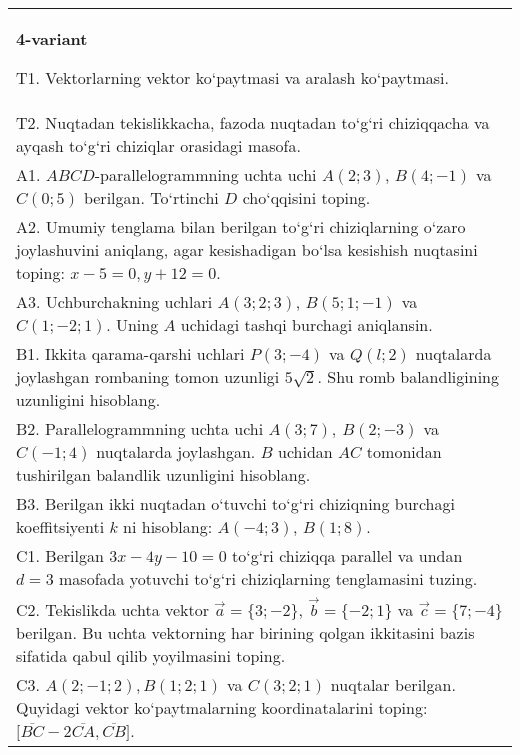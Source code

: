 \documentclass{article}
\begin{document}
\begin{tabular}{m{17cm}}
\textbf{4-variant}

T1. 
Vektorlarning vektor ko‘paytmasi va aralash ko‘paytmasi.
 \\
T2. 
Nuqtadan tekislikkacha, fazoda nuqtadan to‘g‘ri chiziqqacha va ayqash to‘g‘ri chiziqlar orasidagi masofa.
 \\
A1. 
$ABCD$-parallelogrammning uchta uchi
$A (2;3) $, $B (4;-1) $ va $C (0;5) $ berilgan. To‘rtinchi $D$
cho‘qqisini toping.
 \\
A2. 
Umumiy tenglama bilan berilgan to‘g‘ri chiziqlarning
o‘zaro joylashuvini aniqlang, agar kesishadigan bo‘lsa kesishish nuqtasini
toping: $x-5=0, y+12=0$.
 \\
A3. 
Uchburchakning uchlari
$A (3;2; 3) $, $B (5;1; - 1) $ va $C (1; -2;1) $. Uning $A$ uchidagi tashqi burchagi aniqlansin.
 \\
B1. 
Ikkita qarama-qarshi uchlari $P (3; -4) $ va $Q (l;2) $ nuqtalarda joylashgan rombaning tomon uzunligi \(5\sqrt{2}\). Shu romb balandligining uzunligini hisoblang.
 \\
B2. 
Parallelogrammning uchta uchi \(A (3;7),\ B (2;-3) \) va
\(C (-1;4) \) nuqtalarda joylashgan. $B$ uchidan $AC$
tomonidan tushirilgan balandlik uzunligini hisoblang.
 \\
B3. 
Berilgan ikki nuqtadan o‘tuvchi to‘g‘ri chiziqning burchagi
koeffitsiyenti $k$ ni hisoblang: $A (-4;3) $, $B (1;8) $.
 \\
C1. 
Berilgan \(3x-4y-10=0\) to‘g‘ri chiziqqa parallel va undan
$d=3$ masofada yotuvchi to‘g‘ri chiziqlarning tenglamasini tuzing.
 \\
C2. 
Tekislikda uchta vektor $\vec{a} = \{ 3; - 2\}$, $\vec{b} = \{ - 2;1\}$ va $\vec{c} = \{ 7; - 4\}$ berilgan. Bu uchta vektorning har birining qolgan ikkitasini bazis sifatida qabul qilib yoyilmasini toping.
 \\
C3. 
$A (2; -1;2),B (1;2; 1) $ va $C (3;2;1) $ nuqtalar berilgan. Quyidagi vektor ko‘paytmalarning koordinatalarini toping:
$\lbrack\overline{BC} - 2\overline{CA},\overline{CB}\rbrack$. \\

\end{tabular}
\vspace{1cm}
\end{document}
